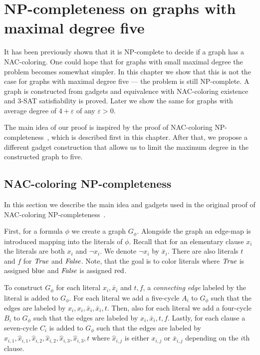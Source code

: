 \chapter{NP-completeness on graphs with maximal degree five}%
\label{chapter:np}

\begin{chapterabstract}

	It has been previously shown that it is NP-complete to decide
	if a graph has a NAC-coloring.
	One could hope that for graphs with small maximal degree
	the problem becomes somewhat simpler.
	In this chapter we show that this is not the case
	for graphs with maximal degree five --- the problem is still NP-complete.
	A graph is constructed from gadgets and equivalence
	with NAC-coloring existence and 3-SAT satisfiability is proved.
	Later we show the same for graphs with average degree of
	$4+\varepsilon$ of any $\varepsilon > 0$.

\end{chapterabstract}

The main idea of our proof is inspired by
the proof of NAC-coloring NP-completeness~\cite{np_complete},
which is described first in this chapter.
After that, we propose a different gadget construction
that allows us to limit the maximum
degree in the constructed graph to five.

\section{NAC-coloring NP-completeness}

In this section we describe the main idea and gadgets used
in the original proof of NAC-coloring NP-completeness~\cite{np_complete}.

First, for a formula \( \phi \) we create a graph \( G_\phi \).
Alongside the graph an edge-map is introduced mapping into the literals
of \( \phi \). Recall that for an elementary clause \( x_i \) the literals
are both \( x_i \) and \( \neg x_i \). We denote \( \lnot x_i \) by \( \bar{x}_i \).
There are also literals \( t \) and \( f \) for \( \textit{True} \) and \( \textit{False} \).
Note, that the goal is to color literals where \( \textit{True} \) is assigned \( \text{blue} \)
and \( \textit{False} \) is assigned \( \text{red} \).

To construct \( G_\phi \) for each literal \( x_i, \bar{x}_i\) and \( t, f \),
a \emph{connecting edge} labeled by the literal is added to \( G_\phi \).
For each literal we add a five-cycle \( A_i \) to \( G_\phi \)
such that the edges are labeled by \( x_i, x_i, \bar{x}_i, \bar{x}_i, t \).
Then, also for each literal we add a four-cycle \( B_i \) to \( G_\phi \)
such that the edges are labeled by \( x_i, \bar{x}_i, t, f \).
Lastly, for each clause a seven-cycle \( C_i \) is added to \( G_\phi \)
such that the edges are labeled by
\( \hat{x}_{i,1}, \hat{x}_{i,1}, \hat{x}_{i,2}, \hat{x}_{i,2}, \hat{x}_{i,3}, \hat{x}_{i,3}, t \)
where \( \hat{x}_{i,j} \) is either \( x_{i,j} \) or \( \bar{x}_{i,j} \)
depending on the \( i \)th clause.

